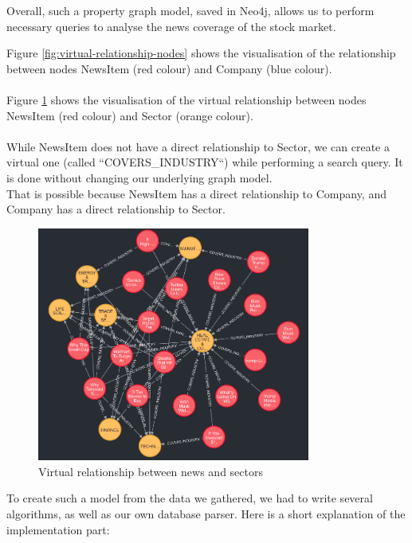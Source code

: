 \noindent Overall, such a property graph model, saved in Neo4j, allows us to perform necessary queries to analyse the news coverage of the stock market.

\noindent Figure \ref{fig:virtual-relationship-nodes} shows the visualisation of the relationship between nodes NewsItem (red colour) and Company (blue colour).\\
\\
\noindent Figure \ref{fig:virtual-relationship-nodes-sectors} shows the visualisation of the virtual relationship between nodes NewsItem (red colour) and Sector (orange colour). \\
\\
While NewsItem does not have a direct relationship to Sector, we can create a virtual one (called ``COVERS\_INDUSTRY``) while performing a search query. It is done without changing our underlying graph model. 
\\
That is possible because NewsItem has a direct relationship to Company, and Company has a direct relationship to Sector.

\begin{figure}[h]
 \centering
 \includegraphics[width=0.8\textwidth]{images/virtual-relationship-between-nodes-sectors.png}
 \caption{Virtual relationship between news and sectors }
 \label{fig:virtual-relationship-nodes-sectors}
\end{figure}

\newpage

\noindent To create such a model from the data we gathered, we had to write several algorithms, as well as our own database parser. Here is a short explanation of the implementation part:

